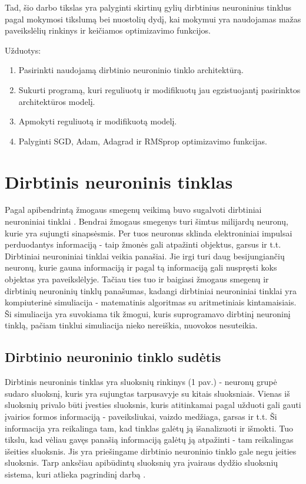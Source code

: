 \documentclass{VUMIFPSkursinis}
\begin{document}
Tad, šio darbo tikslas yra palyginti skirtinų gylių dirbtinius neuroninius tinklus pagal mokymosi tikslumą bei nuostolių dydį, kai mokymui yra naudojamas mažas 
paveikslėlių rinkinys ir keičiamos optimizavimo funkcijos.

Užduotys:
\begin{enumerate}
\item Pasirinkti naudojamą dirbtinio neuroninio tinklo architektūrą.
\item Sukurti programą, kuri reguliuotų ir modifikuotų jau egzistuojantį pasirinktos architektūros modelį.
\item Apmokyti reguliuotą ir modifikuotą modelį.
\item Palyginti SGD, Adam, Adagrad ir RMSprop optimizavimo funkcijas.
\end{enumerate}


\section{Dirbtinis neuroninis tinklas}
Pagal apibendrintą žmogaus smegenų veikimą buvo sugalvoti dirbtiniai neuroniniai tinklai \cite{Goodfellow-et-al-2016}. Bendrai žmogaus smegenys turi šimtus
milijardų neuronų, kurie yra sujungti sinapsėsmis. Per tuos neuronus sklinda elektroniniai impulsai perduodantys informaciją - taip žmonės gali 
atpažinti objektus, garsus ir t.t. Dirbtiniai neuroniniai tinklai veikia panašiai. Jie irgi turi daug besijungiančių neuronų, kurie gauna informaciją ir 
pagal tą informaciją gali nuspręsti koks objektas yra paveikslėlyje. Tačiau ties tuo ir baigiasi žmogaus smegenų ir dirbtinių neuroninių tinklų panašumas, 
kadangi dirbtiniai neuroniniai tinklai yra kompiuterinė simuliacija - matematinis algoritmas su aritmetiniais kintamaisiais. Ši simuliacija yra suvokiama 
tik žmogui, kuris suprogramavo dirbtinį neuroninį tinklą, pačiam tinklui simuliacija nieko nereiškia, nuovokos nesuteikia.

\subsection{Dirbtinio neuroninio tinklo sudėtis}
Dirbtinis neuroninis tinklas yra sluoksnių rinkinys (1 pav.) - neuronų grupė sudaro sluoksnį, kuris yra sujungtas tarpusavyje su kitais sluoksniais. Vienas iš
sluoksnių privalo būti įvesties sluoksnis, kuris atitinkamai pagal užduoti gali gauti įvairios formos informaciją - paveiksliukai, vaizdo
medžiaga, garsas ir t.t. Ši informacija yra reikalinga tam, kad tinklas galėtų ją išanalizuoti ir išmokti. Tuo tikslu, kad vėliau gavęs panašią
informaciją galėtų ją atpažinti - tam reikalingas išeities sluoksnis. Jis yra priešingame dirbtinio neuroninio tinklo gale negu įeities sluoksnis.
Tarp anksčiau apibūdintų sluoksnių yra įvairaus dydžio sluoksnių sistema, kuri atlieka pagrindinį darbą \cite{Woodford-2018}.
\end{document}
